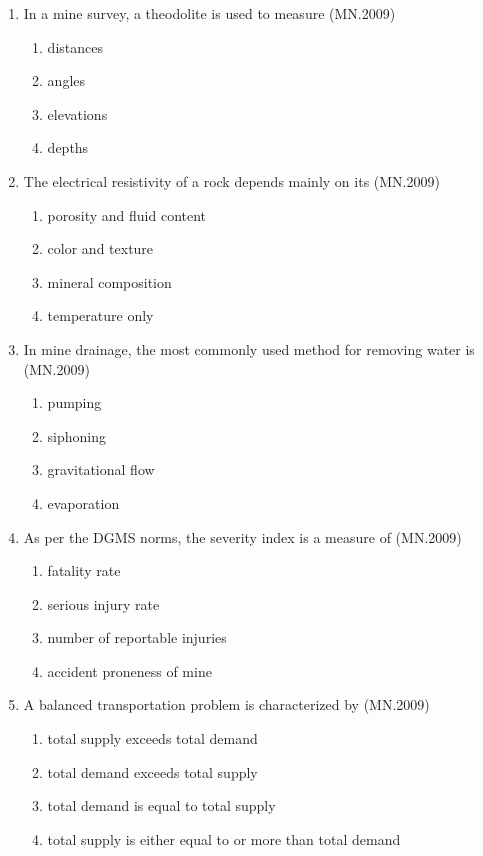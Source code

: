 \documentclass[journal]{IEEEtran}
\numberwithin{equation}{enumi}
\numberwithin{figure}{enumi}
\begin{document}
\begin{enumerate}
\item In a mine survey, a theodolite is used to measure
\hfill{(MN.2009)}
\begin{enumerate}[label=(\Alph*)]
    \item distances
    \item angles
    \item elevations
    \item depths
\end{enumerate}

\item The electrical resistivity of a rock depends mainly on its
\hfill{(MN.2009)}
\begin{enumerate}[label=(\Alph*)]
    \item porosity and fluid content
    \item color and texture
    \item mineral composition
    \item temperature only
\end{enumerate}

\item In mine drainage, the most commonly used method for removing water is
\hfill{(MN.2009)}
\begin{enumerate}[label=(\Alph*)]
    \item pumping
    \item siphoning
    \item gravitational flow
    \item evaporation
\end{enumerate}

\item As per the DGMS norms, the severity index is a measure of
\hfill{(MN.2009)}
\begin{enumerate}[label=(\Alph*)]
    \item fatality rate
    \item serious injury rate
    \item number of reportable injuries
    \item accident proneness of mine
\end{enumerate}

\item A balanced transportation problem is characterized by
\hfill{(MN.2009)}
\begin{enumerate}[label=(\Alph*)]
    \item total supply exceeds total demand
    \item total demand exceeds total supply
    \item total demand is equal to total supply
    \item total supply is either equal to or more than total demand
\end{enumerate}


\end{enumerate}
\end{document}
